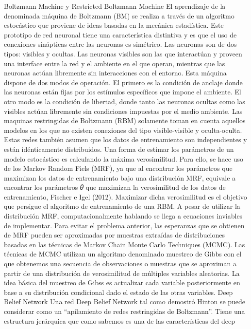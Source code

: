 \documentclass[
  a4paper,
  DIV=11,
  numbers=noendperiod]{scrreprt}
\begin{document}
Boltzmann Machine y Restricted Boltzmann Machine El aprendizaje de la
denominada máquina de Boltzmann (BM) se realiza a través de un algoritmo
estocástico que proviene de ideas basadas en la mecánica estadística.
Este prototipo de red neuronal tiene una característica distintiva y es
que el uso de conexiones sinápticas entre las neuronas es simétrico. Las
neuronas son de dos tipos: visibles y ocultas. Las neuronas visibles son
las que interactúan y proveen una interface entre la red y el ambiente
en el que operan, mientras que las neuronas actúan libremente sin
interacciones con el entorno. Esta máquina dispone de dos modos de
operación. El primero es la condición de anclaje donde las neuronas
están fijas por los estímulos específicos que impone el ambiente. El
otro modo es la condición de libertad, donde tanto las neuronas ocultas
como las visibles actúan libremente sin condiciones impuestas por el
medio ambiente. Las maquinas restringidas de Boltzmann (RBM) solamente
toman en cuenta aquellos modelos en los que no existen conexiones del
tipo visible-visible y oculta-oculta. Estas redes también asumen que los
datos de entrenamiento son independientes y están idénticamente
distribuidos. Una forma de estimar los parámetros de un modelo
estocástico es calculando la máxima verosimilitud. Para ello, se hace
uso de los Markov Random Fiels (MRF), ya que al encontrar los parámetros
que maximizan los datos de entrenamiento bajo una distribución MRF,
equivale a encontrar los parámetros 𝜃 que maximizan la verosimilitud de
los datos de entrenamiento, Fischer e Igel (2012). Maximizar dicha
verosimilitud es el objetivo que persigue el algoritmo de entrenamiento
de una RBM. A pesar de utilizar la distribución MRF, computacionalmente
hablando se llega a ecuaciones inviables de implementar. Para evitar el
problema anterior, las esperanzas que se obtienen de MRF pueden ser
aproximadas por muestras extraídas de distribuciones basadas en las
técnicas de Markov Chain Monte Carlo Techniques (MCMC). Las técnicas de
MCMC utilizan un algoritmo denominado muestreo de Gibbs con el que
obtenemos una secuencia de observaciones o muestras que se aproximan a
partir de una distribución de verosimilitud de múltiples variables
aleatorias. La idea básica del muestreo de Gibss es actualizar cada
variable posteriormente en base a su distribución condicional dado el
estado de las otras variables. Deep Belief Network Una red Deep Belief
Network tal como demostró Hinton se puede considerar como un
``apilamiento de redes restringidas de Boltzmann''. Tiene una estructura
jerárquica que como sabemos es una de las características del deep
\end{document}
